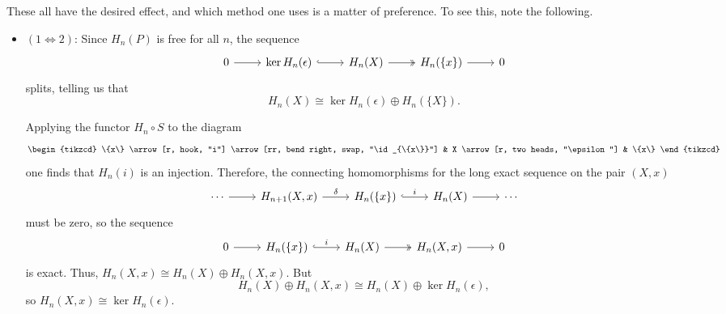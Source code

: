 \documentclass[main.tex]{subfiles}
\begin{document}
These all have the desired effect, and which method one uses is a matter of preference. To see this, note the following.
\begin{itemize}
  \item $(1 \Leftrightarrow 2)$: 
    Since \(H_{n}(P)\) is free for all \(n\), the sequence
    \begin{equation*}
      \begin{tikzcd}
        0
        \arrow[r]
        & \ker H_{n}(\epsilon)
        \arrow[r, hook]
        & H_{n}(X)
        \arrow[r, two heads]
        & H_{n}(\{x\})
        \arrow[r]
        & 0
      \end{tikzcd}
    \end{equation*}
    splits, telling us that
    \begin{equation*}
      H_{n}(X) \cong \ker H_{n}(\epsilon) \oplus H_{n}(\{X\}).
    \end{equation*}

    Applying the functor $H_{n} \circ S$ to the diagram
    \begin{equation*}
      \begin{tikzcd}
        \{x\}
        \arrow[r, hook, "i"]
        \arrow[rr, bend right, swap, "\id_{\{x\}}"]
        & X
        \arrow[r, two heads, "\epsilon"]
        & \{x\}
      \end{tikzcd}
    \end{equation*}
    one finds that $H_{n}(i)$ is an injection. Therefore, the connecting homomorphisms for the long exact sequence on the pair $(X, x)$
    \begin{equation*}
      \begin{tikzcd}
        \cdots
        \arrow[r]
        & H_{n+1}(X, x)
        \arrow[r, "\delta"]
        & H_{n}(\{x\})
        \arrow[r, hook, "i"]
        & H_{n}(X)
        \arrow[r]
        & \cdots
      \end{tikzcd}
    \end{equation*}
    must be zero, so the sequence
    \begin{equation*}
      \begin{tikzcd}
        0
        \arrow[r]
        & H_{n}(\{x\})
        \arrow[r, hook, "i"]
        & H_{n}(X)
        \arrow[r, two heads]
        & H_{n}(X, x)
        \arrow[r]
        & 0
      \end{tikzcd}
    \end{equation*}
    is exact. Thus, \(H_{n}(X, x) \cong H_{n}(X) \oplus H_{n}(X, x)\). But
    \begin{equation*}
      H_{n}(X) \oplus H_{n}(X, x) \cong H_{n}(X) \oplus \ker H_{n}(\epsilon),
    \end{equation*}
    so \(H_{n}(X, x) \cong \ker H_{n}(\epsilon)\).


\end{itemize}
\end{document}
